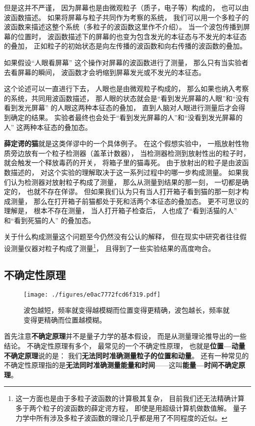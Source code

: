 但是这并不严谨， 因为屏幕也是由微观粒子（质子，电子等）构成的， 也可以由波函数描述。 如果将屏幕与粒子共同作为考察的系统， 我们可以用一个多粒子的波函数来描述这整个系统（多粒子的波函数这里作不介绍）。 当一个波包传播到屏幕的位置时， 波函数描述下的屏幕的也变为包含发光的本征态与不发光的本征态的叠加， 正如粒子的初始状态是向左传播的波函数和向右传播的波函数的叠加。 

如果假设“人眼看屏幕” 这个操作对屏幕的波函数进行了测量， 那么只有当实验者去看屏幕的瞬间， 波函数才会坍缩到屏幕发光或不发光的本征态。

这个论述可以一直进行下去， 人眼也是由微观粒子构成的， 那么如果也纳入考察的系统，共同用波函数描述， 那人眼的状态就会是“看到发光屏幕的人眼”和“没有看到发光屏幕” 的人眼这两种本征态的叠加， 直到人脑对人眼进行测量后才会得到确定的结果。 实验者最终也会处于“看到发光屏幕的人”和“没看到发光屏幕的人” 这两种本征态的叠加态。

\textbf{薛定谔的猫}就是这类佯谬中的一个具体例子。 在这个假想实验中， 一瓶放射性物质旁边放有一个粒子检测器（盖革计数器）， 当检测器检测到放射性出的粒子时， 就会触发一个释放毒药的开关， 将箱子里的猫毒死。 由于放射出的粒子是由波函数描述的， 对这个实验的理解取决于这一系列过程中的哪一步构成测量。 如果我们认为检测器对放射粒子构成了测量， 那么从测量到结果的那一刻， 一切都是确定的， 也就不存在佯谬。 但如果我们认为只有当人打开箱子看到猫的那一刻才构成测量， 那么在打开箱子前猫都处于死和活两个本征态的叠加态。 更不可思议的理解是， 根本不存在测量， 当人打开箱子检查后， 人也成了“看到活猫的人” 和“看到死猫的人” 的叠加态。

关于什么构成测量这个问题至今仍然没有公认的解释， 但在现实中研究者往往假设测量仪器对粒子构成了测量\footnote{这一方面也是由于多粒子波函数的计算极其复杂， 目前我们还无法精确计算多于两个粒子的波函数的薛定谔方程， 即使是用超级计算机做数值解。 量子力学中所有涉及多粒子波函数的理论几乎都是用了不同程度的近似。}， 且得到了一些实验结果的高度吻合。

\subsection{不确定性原理}

\begin{figure}[ht]
\centering
\texttt{[image: ./figures/e0ac7772fcd6f319.pdf]}
\caption{波包越短，频率就变得越模糊而位置变得更精确，波包越长，频率就变得更精确而位置越模糊。} \label{fig_QM0_5}
\end{figure}

首先注意\textbf{不确定原理}并不是量子力学的基本假设， 而是从测量理论推导出的一些结论。 不确定性原理有多个， 最常见的一个不确定性原理， 也就是\textbf{位置—动量不确定原理}说的是： 我们\textbf{无法同时准确测量粒子的位置和动量}。 还有一种常见的不确定性原理指的是\textbf{无法同时准确测量能量和时间}——这叫\textbf{能量—时间不确定原理}。

